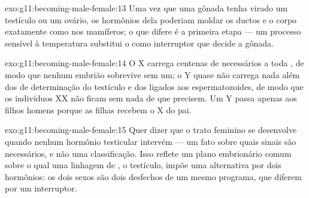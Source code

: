 \begin{solution}{exo:g11:becoming-male-female:13}
Uma vez que uma gônada tenha virado um testículo ou um ovário, os
hormônios dela poderiam moldar os ductos e o corpo exatamente como nos
mamíferos; o que difere é a primeira etapa --- um processo sensível à
temperatura substitui o  como interruptor que decide a gônada.
\end{solution}

\begin{solution}{exo:g11:becoming-male-female:14}
O X carrega centenas de  necessários a toda , de modo que
nenhum embrião sobrevive sem um; o Y quase não carrega nada além dos
 de determinação do testículo e dos ligados aos espermatozoides,
de modo que os indivíduos XX não ficam sem nada de que precisem. Um Y
passa apenas aos filhos homens porque as filhas recebem o X do pai.
\end{solution}

\begin{solution}{exo:g11:becoming-male-female:15}
Quer dizer que o trato feminino se desenvolve quando nenhum hormônio
testicular intervém --- um fato sobre quais sinais são necessários, e
não uma classificação. Isso reflete um plano embrionário comum sobre o
qual uma linhagem de , o testículo, impõe uma alternativa por
dois hormônios: os dois sexos são dois desfechos de um mesmo programa,
que diferem por um interruptor.
\end{solution}

